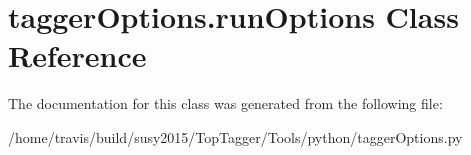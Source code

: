\hypertarget{classtaggerOptions_1_1runOptions}{\section{tagger\-Options.\-run\-Options Class Reference}
\label{classtaggerOptions_1_1runOptions}
}


The documentation for this class was generated from the following file\-:\begin{DoxyCompactItemize}
\item 
/home/travis/build/susy2015/\-Top\-Tagger/\-Tools/python/tagger\-Options.\-py\end{DoxyCompactItemize}
